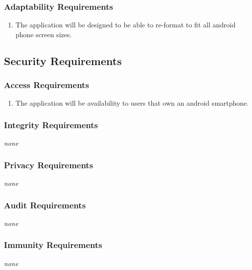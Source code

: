 \documentclass[12pt, titlepage]{article}
\begin{document}
\subsubsection{Adaptability Requirements}
\label{ssub:adaptability_requirements}
\begin{enumerate}[{MS}3. ]
	\item The application will be designed to be able to re-format to fit all android phone screen sizes.
\end{enumerate}


\subsection{Security Requirements}
\label{sub:security_requirements}

\subsubsection{Access Requirements}
\label{ssub:access_requirements}
\begin{enumerate}[{SR}1. ]
	\item The application will be availability to users that own an android smartphone.
\end{enumerate}

\subsubsection{Integrity Requirements}
\label{ssub:integrity_requirements}
\emph{none}

\subsubsection{Privacy Requirements}
\label{ssub:privacy_requirements}
\emph{none}

\subsubsection{Audit Requirements}
\label{ssub:audit_requirements}
\emph{none}

\subsubsection{Immunity Requirements}
\label{ssub:immunity_requirements}
\emph{none}
\end{document}
